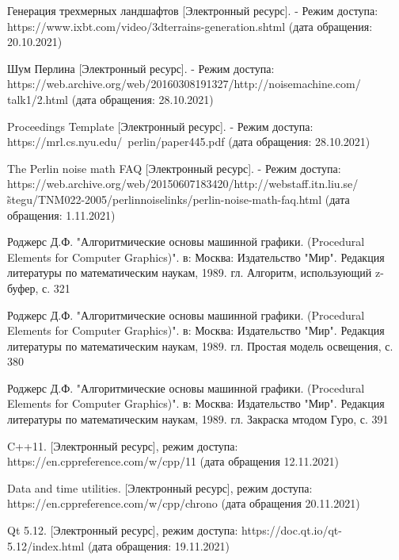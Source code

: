 \renewcommand\bibname{Список литературы}
\begin{thebibliography}{3}
	Генерация трехмерных ландшафтов [Электронный ресурс]. - Режим доступа: https://www.ixbt.com/video/3dterrains-generation.shtml (дата обращения: 20.10.2021)
	
	Шум Перлина [Электронный ресурс]. - Режим доступа: https://web.archive.org/web/20160308191327/http://noisemachine.com/
	talk1/2.html (дата обращения: 28.10.2021)	
	
	Proceedings Template [Электронный ресурс]. - Режим доступа: https://mrl.cs.nyu.edu/~perlin/paper445.pdf (дата обращения: 28.10.2021)
	
	The Perlin noise math FAQ [Электронный ресурс]. - Режим доступа: https://web.archive.org/web/20150607183420/http://webstaff.itn.liu.se/
	\~stegu/TNM022-2005/perlinnoiselinks/perlin-noise-math-faq.html (дата обращения: 1.11.2021)
	
	Роджерс Д.Ф. "Алгоритмические основы машинной графики. (Procedural Elements for Computer Graphics)". в: Москва: Издательство "Мир". Редакция литературы по математическим наукам, 1989. гл. Алгоритм, использующий z-буфер, с. 321
	
	Роджерс Д.Ф. "Алгоритмические основы машинной графики. (Procedural Elements for Computer Graphics)". в: Москва: Издательство "Мир". Редакция литературы по математическим наукам, 1989. гл. Простая модель освещения, с. 380
	
	Роджерс Д.Ф. "Алгоритмические основы машинной графики. (Procedural Elements for Computer Graphics)". в: Москва: Издательство "Мир". Редакция литературы по математическим наукам, 1989. гл. Закраска мтодом Гуро, с. 391
	
	C++11. [Электронный ресурс], режим доступа: https://en.cppreference.com/w/cpp/11 (дата обращения 12.11.2021)	
	
	Data and time utilities. [Электронный ресурс], режим доступа: https://en.cppreference.com/w/cpp/chrono (дата обращения 20.11.2021)
	
	Qt 5.12. [Электронный ресурс], режим доступа: https://doc.qt.io/qt-5.12/index.html (дата обращения: 19.11.2021)
\end{thebibliography}